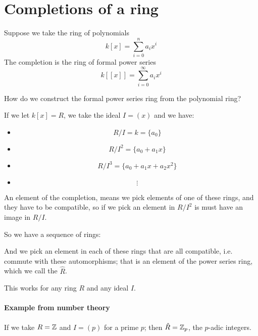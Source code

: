 \section{Completions of a ring}
\begin{example}
    Suppose we take the ring of polynomials \[k[x] = \sum_{i=0}^n a_i x^i\]
    The completion is the ring of formal power series \[k[[x]] = \sum_{i=0}^\infty a_i x^i\]

    How do we construct the formal power series ring from the polynomial ring?

    If we let $k[x] = R$, we take the ideal $I = (x)$ and we have:\begin{itemize}
        \item \[R/I = k = \{a_0\}\]
        \item \[R/I^2 = \{a_0+a_1x\}\]
        \item \[R/I^3 = \{a_0+a_1x+a_2x^2\}\]
        \item \[\vdots\]
    \end{itemize}
    An element of the completion, means we pick elements of one of these rings, and they have to be compatible, so if we pick an element in $R/I^2$ is must have an image in $R/I$.

    So we have a sequence of rings:
    \begin{center}
    \end{center}
    
    And we pick an element in each of these rings that are all compatible, i.e. commute with these automorphisms; that is an element of the power series ring, which we call the  $\hat{R}$. 
\end{example}

This works for any ring $R$ and any ideal $I$.

\paragraph*{Example from number theory}
\begin{example}
    If we take $R=\mathbb{Z}$ and $I=(p)$ for a prime $p$; then $\hat{R} = \mathbb{Z}_p$, the $p$-adic integers.    
\end{example}

